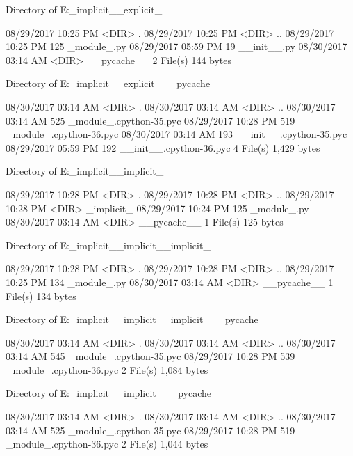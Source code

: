  Directory of E:\Python\apeman\mockup\implicitImport\_implicit_\_explicit_

08/29/2017  10:25 PM    <DIR>          .
08/29/2017  10:25 PM    <DIR>          ..
08/29/2017  10:25 PM               125 _module_.py
08/29/2017  05:59 PM                19 __init__.py
08/30/2017  03:14 AM    <DIR>          __pycache__
               2 File(s)            144 bytes

 Directory of E:\Python\apeman\mockup\implicitImport\_implicit_\_explicit_\__pycache__

08/30/2017  03:14 AM    <DIR>          .
08/30/2017  03:14 AM    <DIR>          ..
08/30/2017  03:14 AM               525 _module_.cpython-35.pyc
08/29/2017  10:28 PM               519 _module_.cpython-36.pyc
08/30/2017  03:14 AM               193 __init__.cpython-35.pyc
08/29/2017  05:59 PM               192 __init__.cpython-36.pyc
               4 File(s)          1,429 bytes

 Directory of E:\Python\apeman\mockup\implicitImport\_implicit_\_implicit_

08/29/2017  10:28 PM    <DIR>          .
08/29/2017  10:28 PM    <DIR>          ..
08/29/2017  10:28 PM    <DIR>          _implicit_
08/29/2017  10:24 PM               125 _module_.py
08/30/2017  03:14 AM    <DIR>          __pycache__
               1 File(s)            125 bytes

 Directory of E:\Python\apeman\mockup\implicitImport\_implicit_\_implicit_\_implicit_

08/29/2017  10:28 PM    <DIR>          .
08/29/2017  10:28 PM    <DIR>          ..
08/29/2017  10:25 PM               134 _module_.py
08/30/2017  03:14 AM    <DIR>          __pycache__
               1 File(s)            134 bytes

 Directory of E:\Python\apeman\mockup\implicitImport\_implicit_\_implicit_\_implicit_\__pycache__

08/30/2017  03:14 AM    <DIR>          .
08/30/2017  03:14 AM    <DIR>          ..
08/30/2017  03:14 AM               545 _module_.cpython-35.pyc
08/29/2017  10:28 PM               539 _module_.cpython-36.pyc
               2 File(s)          1,084 bytes

 Directory of E:\Python\apeman\mockup\implicitImport\_implicit_\_implicit_\__pycache__

08/30/2017  03:14 AM    <DIR>          .
08/30/2017  03:14 AM    <DIR>          ..
08/30/2017  03:14 AM               525 _module_.cpython-35.pyc
08/29/2017  10:28 PM               519 _module_.cpython-36.pyc
               2 File(s)          1,044 bytes

